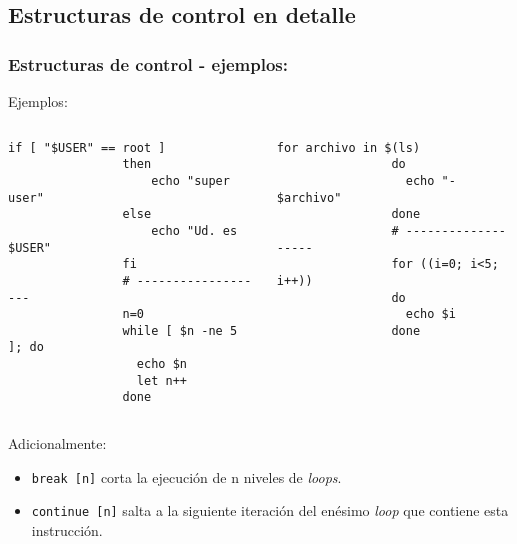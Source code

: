 \subsection{Estructuras de control en detalle}
\begin{frame}[fragile]
	\frametitle{Estructuras de control - ejemplos:}
	\begin{block}{Ejemplos:}
	\begin{columns}
		\begin{column}{.45\linewidth}
			\begin{lstlisting}[basicstyle=\tiny]
				if [ "$USER" == root ]
				then
				    echo "super user"
				else
				    echo "Ud. es $USER"
				fi
				# -------------------
				n=0
				while [ $n -ne 5 ]; do
				  echo $n 
				  let n++
				done
			\end{lstlisting}
		\end{column}
		\begin{column}{.45\linewidth}
			\begin{lstlisting}[basicstyle=\tiny]
				for archivo in $(ls)‏
				do
				  echo "- $archivo"
				done
				# -------------------
				for ((i=0; i<5; i++))‏
				do
				  echo $i
				done
			\end{lstlisting}
		\end{column}
	\end{columns}
	\end{block}
    \pause
	Adicionalmente:
	\begin{itemize}
    \item \texttt{break [n]} corta la ejecución de n niveles de
      \textit{loops}.
    \item \texttt{continue [n]} salta a la siguiente iteración del enésimo
      \textit{loop} que contiene esta instrucción.
	\end{itemize}
\end{frame}

